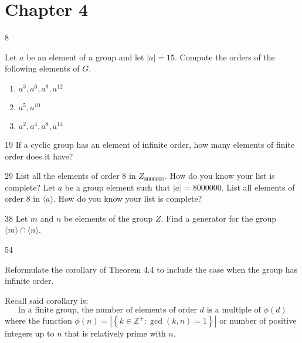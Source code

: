 \section*{Chapter 4}

\begin{hwproblem}
{8}{
    Let $a$ be an element of a group and let $|a|=15$. Compute the orders of the following elements of $G$.
    \begin{enumerate}[label=\alph*.]
        \item $a^3, a^6, a^9, a^{12}$
        \item $a^5, a^{10}$
        \item $a^2, a^4, a^8, a^{14}$
    \end{enumerate}
}
\end{hwproblem}

\begin{hwproblem}
{19}{
    If a cyclic group has an element of infinite order, how many elements of finite order does it have?
}
\end{hwproblem}

\begin{hwproblem}
{29}{
    List all the elements of order 8 in $Z_{8000000}$. How do you know your list is complete? Let $a$ be a group element such that $|a|=8000000$. List all elements of order 8 in $\langle a\rangle$. How do you know your list is complete?
}
\end{hwproblem}

\begin{hwproblem}
{38}{
    Let $m$ and $n$ be elements of the group $Z$. Find a generator for the group $\langle m\rangle \cap\langle n\rangle$.
}
\end{hwproblem}

\begin{hwproblem}
{54}{
    Reformulate the corollary of Theorem 4.4 to include the case when the group has infinite order.

    Recall said corollary is:
    \[
        \text{In a finite group, the number of elements of order $d$ is a multiple of $\phi(d)$}
    \]
    where the function \(\phi(n) = \left|\left\{k \in \mathbb{Z}^+: \gcd(k, n) = 1\right\}\right|\) or number of positive integers up to \(n\) that is relatively prime with \(n\).
}
\end{hwproblem}
